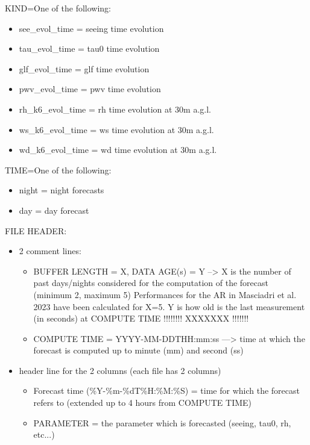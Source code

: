 \documentclass[11pt,english]{article}
\begin{document}
KIND=One of the following:
\begin{itemize}
\item    see\_evol\_time = seeing time evolution
\item    tau\_evol\_time = tau0 time evolution
\item    glf\_evol\_time = glf time evolution
\item    pwv\_evol\_time = pwv time evolution
\item    rh\_k6\_evol\_time = rh time evolution at 30m a.g.l.
\item    ws\_k6\_evol\_time = ws time evolution at 30m a.g.l.
\item    wd\_k6\_evol\_time = wd time evolution at 30m a.g.l.
\end{itemize}
TIME=One of the following:
\begin{itemize}
\item    night = night forecasts
\item    day = day forecast
\end{itemize}

FILE HEADER:
\begin{itemize}
\item        2 comment lines:
  \begin{itemize}
  \item                BUFFER LENGTH = X, DATA AGE(s) = Y --> X is the number of past days/nights considered for the computation of the forecast (minimum 2, maximum 5)
                                                       Performances for the AR in Masciadri et al. 2023 have been calculated for X=5.
                                                       Y is how old is the last measurement (in seconds) at COMPUTE TIME  !!!!!!!!   XXXXXXX  !!!!!!!
  \item                COMPUTE TIME = YYYY-MM-DDTHH:mm:ss  ---> time at which the forecast is computed up to minute (mm) and second (ss)
  \end{itemize}
\item        header line for the 2 columns (each file has 2 columns)
  \begin{itemize}
  \item                Forecast time (\%Y-\%m-\%dT\%H:\%M:\%S) = time for which the forecast refers to (extended up to 4 hours from COMPUTE TIME)
  \item                PARAMETER = the parameter which is forecasted (seeing, tau0, rh, etc...)
  \end{itemize}
\end{itemize}
%
\end{document}
